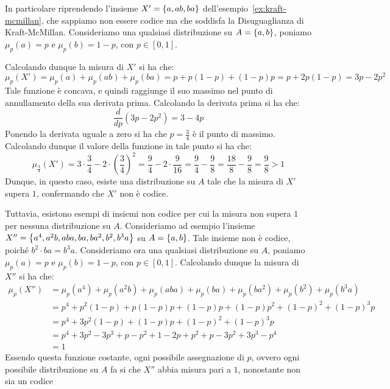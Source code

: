 \begin{example}{}
  
  In particolare riprendendo l'insieme \(X' = \set{a,ab,ba}\) dell'esempio~\ref{ex:kraft-mcmillan}, che sappiamo non essere codice ma che soddisfa la Disuguaglianza di Kraft-McMillan.
  Consideriamo una qualsiasi distribuzione su \(A = \set{a,b}\), poniamo \(\mu_p(a) = p\) e \(\mu_p(b) = 1-p\), con \(p \in [0,1]\).
  
  Calcolando dunque la misura di \(X'\) si ha che:
  \[\mu_p(X') = \mu_p(a) + \mu_p(ab) + \mu_p(ba) = p + p(1-p) + (1-p)p = p + 2p(1-p) = 3p - 2p^2\]
  Tale funzione è concava, e quindi raggiunge il suo massimo nel punto di annullamento della sua derivata prima.
  Calcolando la derivata prima si ha che:
  \[\frac{d}{dp}(3p - 2p^2) = 3 - 4p\]
  Ponendo la derivata uguale a zero si ha che \(p = \frac{3}{4}\) è il punto di massimo.
  Calcolando dunque il valore della funzione in tale punto si ha che:
  \[\mu_{\frac{3}{4}}(X') = 3\cdot \frac{3}{4} - 2 \cdot {\left(\frac{3}{4}\right)}^2 = \frac{9}{4} - 2 \cdot \frac{9}{16} = \frac{9}{4} - \frac{9}{8} = \frac{18}{8} - \frac{9}{8} = \frac{9}{8} > 1\]
  Dunque, in questo caso, esiste una distribuzione su \(A\) tale che la misura di \(X'\) supera \(1\), confermando che \(X'\) non è codice.
  
  Tuttavia, esistono esempi di insiemi non codice per cui la misura non supera \(1\) per nessuna distribuzione su \(A\).
  Consideriamo ad esempio l'insieme \(X'' = \set{a^4,a^2b,aba,ba,ba^2,b^2,b^3a}\) su \(A = \set{a,b}\).
  Tale insieme non è codice, poiché \(b^2 \cdot ba = b^3a\).
  Consideriamo ora una qualsiasi distribuzione su \(A\), poniamo \(\mu_p(a) = p\) e \(\mu_p(b) = 1-p\), con \(p \in [0,1]\).
  Calcolando dunque la misura di \(X''\) si ha che:
  \begin{align*}
    \mu_p(X'') &= \mu_p(a^4) + \mu_p(a^2b) + \mu_p(aba) + \mu_p(ba) + \mu_p(ba^2) + \mu_p(b^2) + \mu_p(b^3a) \\
    &= p^4 + p^2(1-p) + p(1-p)p + (1-p)p + (1-p)p^2 + {(1-p)}^2 + {(1-p)}^3p \\
    &= p^4 + 3p^2(1-p) + (1-p)p + {(1-p)}^2 + {(1-p)}^3p \\
    &= p^4 + 3p^2 - 3p^3 + p - p^2 + 1 - 2p + p^2 + p - 3p^2 + 3p^3 - p^4 \\
    &= 1
  \end{align*}
  Essendo questa funzione costante, ogni possibile assegnazione di \(p\), ovvero ogni possibile distribuzione su \(A\) fa si che \(X''\) abbia misura pari a \(1\), nonostante non sia un codice
\end{example}

